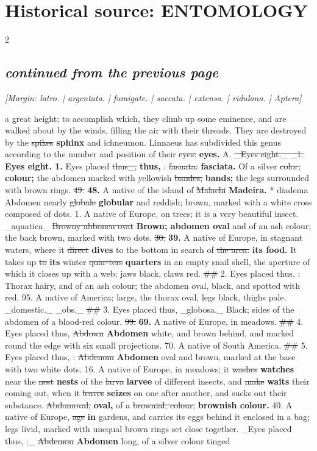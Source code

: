 \documentclass[10pt]{article}
\begin{document}
\section*{Historical source: ENTOMOLOGY}
\begin{multicols}{2}
\subsection*{\textit{continued from the previous page}}
{\small\itshape [Margin: \emph{latro.} | \emph{argentata.} | fumigate. | \emph{saccata.} | \emph{extensa.} | \emph{ridulana.} | Aptera]}\par
a great height; to accomplish which, they climb up some eminence, and are walked about by the winds, filling the air with their threads. They are destroyed by the \sout{spikes} \textbf{sphinx} and ichneumon. Linnaeus has subdivided this genus according to the number and position of their \sout{eyes:} \textbf{eyes.} A. \sout{\_Eyes eight.\_ \_1.} \textbf{Eyes eight. 1.} Eyes placed \sout{thus\_,} \textbf{thus,} : \sout{fasnata.} \textbf{fasciata.} Of a silver \sout{color;} \textbf{colour;} the abdomen marked with yellowish \sout{bandes;} \textbf{bands;} the legs surrounded with brown rings. \sout{49.} \textbf{48.} A native of the island of \sout{Malachi} \textbf{Madeira.} * diadema Abdomen nearly \sout{globale} \textbf{globular} and reddish; brown, marked with a white cross composed of dots. 1. A native of Europe, on trees; it is a very beautiful insect. \_aquatica\_ \sout{Browny abbonen ovat} \textbf{Brown; abdomen oval} and of an ash colour; the back brown, marked with two dots. \sout{30.} \textbf{39.} A native of Europe, in stagnant waters, where it \sout{direct} \textbf{dives} to the bottom in search of \sout{the area.} \textbf{its food.} It takes up \sout{to} \textbf{its} winter \sout{quar-ters} \textbf{quarters} in an empty snail shell, the aperture of which it closes up with a web; jaws black, claws red. \sout{\#\#} 2. Eyes placed thus, : Thorax hairy, and of an ash colour; the abdomen oval, black, and spotted with red. 95. A native of America; large, the thorax oval, legs black, thighs pale. \_domestic.\_ \_obs.\_ \sout{\#\#} 3. Eyes placed thus, \_globosa.\_ Black; sides of the abdomen of a blood-red colour. \sout{99.} \textbf{69.} A native of Europe, in meadows. \sout{\#\#} 4. Eyes placed thus, \sout{Abdown} \textbf{Abdomen} white, and brown behind, and marked round the edge with six small projections. 70. A native of South America. \sout{\#\#} 5. Eyes placed thus, : \sout{Abdenom} \textbf{Abdomen} oval and brown, marked at the base with two white dots. 16. A native of Europe, in meadows; it \sout{washes} \textbf{watches} near the \sout{nest} \textbf{nests} of the \sout{larva} \textbf{larvee} of different insects, and \sout{make} \textbf{waits} their coming out, when it \sout{leaves} \textbf{seizes} on one after another, and sucks out their substance. \sout{Abdomoval,} \textbf{oval,} of a \sout{brownial, colour,} \textbf{brownish colour.} 40. A native of Europe, \sout{age} \textbf{in} gardens, and carries its eggs behind it enclosed in a bag; legs livid, marked with unequal brown rings set close together. \_Eyes placed thus, :\_ \sout{Abdemon} \textbf{Abdomen} long, of a silver colour tinged 
\end{multicols}
\end{document}
